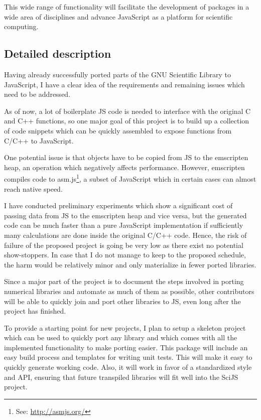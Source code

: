 \documentclass{scrartcl}
\begin{document}
This wide range of functionality will facilitate the development of packages in a wide area of disciplines and advance JavaScript as a platform for scientific computing.

\subsection*{Detailed description}

Having already successfully ported parts of the GNU Scientific Library to JavaScript, I have a clear idea of the requirements and remaining issues which need to be addressed. 

As of now, a lot of boilerplate JS code is needed to interface with the original C and C++ functions, so one major goal of this project is to build up a collection of code snippets which can be quickly assembled to expose functions from C/C++ to JavaScript. 

One potential issue is that objects have to be copied from JS to the emscripten heap, an operation which negatively affects performance. However, emscripten compiles code to asm.js\footnote{See: \url{http://asmjs.org/}}, a subset of JavaScript which in certain cases can almost reach native speed. 

I have conducted preliminary experiments which show a significant cost of passing data from JS to the emscripten heap and vice versa, but the generated code can be much faster than a pure JavaScript implementation if sufficiently many calculations are done inside the original C/C++ code. Hence, the risk of failure of the proposed project is going be very low as there exist no potential show-stoppers. In case that I do not manage to keep to the proposed schedule, the harm would be relatively minor and only materialize in fewer ported libraries. 

Since a major part of the project is to document the steps involved in porting numerical libraries and automate as much of them as possible, other contributors will be able to quickly join and port other libraries to JS, even long after the project has finished. 

To provide a starting point for new projects, I plan to setup a skeleton project which can be used to quickly port any library and which comes with all the implemented functionality to make porting easier. This package will include an easy build process and templates for writing unit tests. This will make it easy to quickly generate working code. Also, it will work in favor of a standardized style and API, ensuring that future transpiled libraries will fit well into the SciJS project. 
\end{document}
